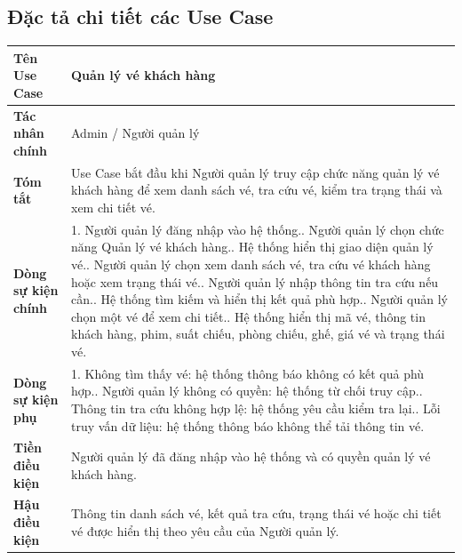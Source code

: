 \subsection{Đặc tả chi tiết các Use Case}
\begin{longtable}{|p{4.2cm}|p{11.3cm}|}
\hline
\rowcolor{headerblue} \textbf{Tên Use Case} & \textbf{Quản lý vé khách hàng} \\ \hline
\endhead
\textbf{Tác nhân chính} & Admin / Người quản lý \\ \hline
\textbf{Tóm tắt} & Use Case bắt đầu khi Người quản lý truy cập chức năng quản lý vé khách hàng để xem danh sách vé, tra cứu vé, kiểm tra trạng thái và xem chi tiết vé. \\ \hline
\textbf{Dòng sự kiện chính} & 1. Người quản lý đăng nhập vào hệ thống.\newline 2. Người quản lý chọn chức năng Quản lý vé khách hàng.\newline 3. Hệ thống hiển thị giao diện quản lý vé.\newline 4. Người quản lý chọn xem danh sách vé, tra cứu vé khách hàng hoặc xem trạng thái vé.\newline 5. Người quản lý nhập thông tin tra cứu nếu cần.\newline 6. Hệ thống tìm kiếm và hiển thị kết quả phù hợp.\newline 7. Người quản lý chọn một vé để xem chi tiết.\newline 8. Hệ thống hiển thị mã vé, thông tin khách hàng, phim, suất chiếu, phòng chiếu, ghế, giá vé và trạng thái vé. \\ \hline
\textbf{Dòng sự kiện phụ} & 1. Không tìm thấy vé: hệ thống thông báo không có kết quả phù hợp.\newline 2. Người quản lý không có quyền: hệ thống từ chối truy cập.\newline 3. Thông tin tra cứu không hợp lệ: hệ thống yêu cầu kiểm tra lại.\newline 4. Lỗi truy vấn dữ liệu: hệ thống thông báo không thể tải thông tin vé. \\ \hline
\textbf{Tiền điều kiện} & Người quản lý đã đăng nhập vào hệ thống và có quyền quản lý vé khách hàng. \\ \hline
\textbf{Hậu điều kiện} & Thông tin danh sách vé, kết quả tra cứu, trạng thái vé hoặc chi tiết vé được hiển thị theo yêu cầu của Người quản lý. \\ \hline
\end{longtable}

